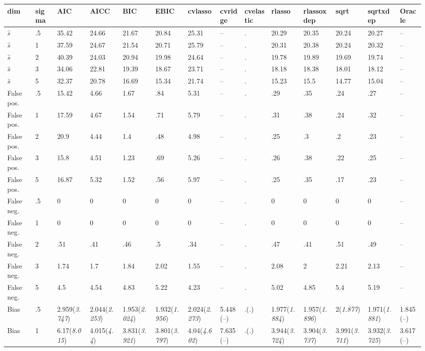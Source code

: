 \documentclass{article}
\begin{document}
\begin{table}[tbp] \centering
{}

{\tiny
\begin{tabularx}{\textwidth}{lCCCCCCCCCCCCC}

\toprule
{dim}&{sigma}&{AIC}&{AICC}&{BIC}&{EBIC}&{cvlasso}&{cvridge}&{cvelastic}&{rlasso}&{rlassoxdep}&{sqrt}&{sqrtxdep}&{Oracle} \tabularnewline
\midrule\addlinespace[1.5ex]
$\hat{s}$&.5&35.42&24.66&21.67&20.84&25.31&--&.&20.29&20.35&20.24&20.27&-- \tabularnewline
$\hat{s}$&1&37.59&24.67&21.54&20.71&25.79&--&.&20.31&20.38&20.24&20.32&-- \tabularnewline
$\hat{s}$&2&40.39&24.03&20.94&19.98&24.64&--&.&19.78&19.89&19.69&19.74&-- \tabularnewline
$\hat{s}$&3&34.06&22.81&19.39&18.67&23.71&--&.&18.18&18.38&18.01&18.12&-- \tabularnewline
$\hat{s}$&5&32.37&20.78&16.69&15.34&21.74&--&.&15.23&15.5&14.77&15.04&-- \tabularnewline
\midrule False pos.&.5&15.42&4.66&1.67&.84&5.31&--&.&.29&.35&.24&.27&-- \tabularnewline
False pos.&1&17.59&4.67&1.54&.71&5.79&--&.&.31&.38&.24&.32&-- \tabularnewline
False pos.&2&20.9&4.44&1.4&.48&4.98&--&.&.25&.3&.2&.23&-- \tabularnewline
False pos.&3&15.8&4.51&1.23&.69&5.26&--&.&.26&.38&.22&.25&-- \tabularnewline
False pos.&5&16.87&5.32&1.52&.56&5.97&--&.&.25&.35&.17&.23&-- \tabularnewline
\midrule False neg.&.5&0&0&0&0&0&--&.&0&0&0&0&-- \tabularnewline
False neg.&1&0&0&0&0&0&--&.&0&0&0&0&-- \tabularnewline
False neg.&2&.51&.41&.46&.5&.34&--&.&.47&.41&.51&.49&-- \tabularnewline
False neg.&3&1.74&1.7&1.84&2.02&1.55&--&.&2.08&2&2.21&2.13&-- \tabularnewline
False neg.&5&4.5&4.54&4.83&5.22&4.23&--&.&5.02&4.85&5.4&5.19&-- \tabularnewline
\midrule Bias&.5&2.959\newline (\emph{3.747})&2.044\newline (\emph{2.253})&1.953\newline (\emph{2.024})&1.932\newline (\emph{1.956})&2.024\newline (\emph{2.273})&5.448\newline (--)&.\newline (\emph{.})&1.977\newline (\emph{1.884})&1.957\newline (\emph{1.896})&2\newline (\emph{1.877})&1.971\newline (\emph{1.881})&1.845\newline (--) \tabularnewline
Bias&1&6.17\newline (\emph{8.015})&4.015\newline (\emph{4.4})&3.831\newline (\emph{3.921})&3.801\newline (\emph{3.797})&4.04\newline (\emph{4.602})&7.635\newline (--)&.\newline (\emph{.})&3.944\newline (\emph{3.724})&3.904\newline (\emph{3.737})&3.991\newline (\emph{3.711})&3.932\newline (\emph{3.725})&3.617\newline (--) \tabularnewline

\end{tabularx}}
\end{table}
\end{document}
